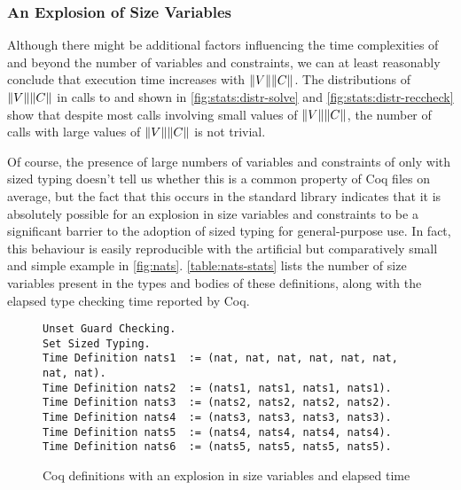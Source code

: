 \subsubsection{An Explosion of Size Variables}

Although there might be additional factors influencing the time complexities of \solve and \RecCheck beyond the number of variables and constraints,
we can at least reasonably conclude that execution time increases with $\lVert V\rVert\lVert C\rVert$.
The distributions of $\lVert V\rVert\lVert C\rVert$ in calls to \solve and \RecCheck shown in \autoref{fig:stats:distr-solve} and \autoref{fig:stats:distr-reccheck}
show that despite most calls involving small values of $\lVert V\rVert\lVert C\rVert$,
the number of calls with large values of $\lVert V\rVert\lVert C\rVert$ is not trivial.

Of course, the presence of large numbers of variables and constraints of only \msetlist with sized typing
doesn't tell us whether this is a common property of Coq files on average,
but the fact that this occurs in the standard library indicates that it is absolutely possible
for an explosion in size variables and constraints to be a significant barrier to the adoption of sized typing for general-purpose use.
In fact, this behaviour is easily reproducible with the artificial but comparatively small and simple example in \autoref{fig:nats}.
\autoref{table:nats-stats} lists the number of size variables present in the types and bodies of these definitions,
along with the elapsed type checking time reported by Coq.

\begin{figure}[h]
\begin{verbatim}
Unset Guard Checking.
Set Sized Typing.
Time Definition nats1  := (nat, nat, nat, nat, nat, nat, nat, nat).
Time Definition nats2  := (nats1, nats1, nats1, nats1).
Time Definition nats3  := (nats2, nats2, nats2, nats2).
Time Definition nats4  := (nats3, nats3, nats3, nats3).
Time Definition nats5  := (nats4, nats4, nats4, nats4).
Time Definition nats6  := (nats5, nats5, nats5, nats5).
\end{verbatim}
\caption{Coq definitions with an explosion in size variables and elapsed time}
\label{fig:nats}
\end{figure}

